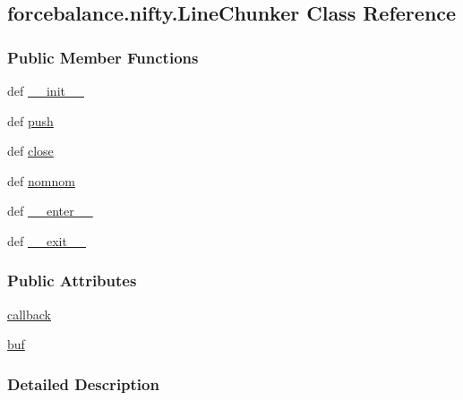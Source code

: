 \hypertarget{classforcebalance_1_1nifty_1_1LineChunker}{\subsection{forcebalance.\-nifty.\-Line\-Chunker \-Class \-Reference}
\label{classforcebalance_1_1nifty_1_1LineChunker}
}
\subsubsection*{\-Public \-Member \-Functions}
\begin{DoxyCompactItemize}
\item 
def \hyperlink{classforcebalance_1_1nifty_1_1LineChunker_ae3ab9c66002ff8c9cb1c431037a5b1bd}{\-\_\-\-\_\-init\-\_\-\-\_\-}
\item 
def \hyperlink{classforcebalance_1_1nifty_1_1LineChunker_a55559f3b01f982fabd8521d3255a659c}{push}
\item 
def \hyperlink{classforcebalance_1_1nifty_1_1LineChunker_a3ff808a8e8d1f37c1509b2c8a40793a0}{close}
\item 
def \hyperlink{classforcebalance_1_1nifty_1_1LineChunker_a8136910aad30f357f0ededf79803e582}{nomnom}
\item 
def \hyperlink{classforcebalance_1_1nifty_1_1LineChunker_a968159ea8646ab0a1b5f5a9428855ce5}{\-\_\-\-\_\-enter\-\_\-\-\_\-}
\item 
def \hyperlink{classforcebalance_1_1nifty_1_1LineChunker_a02b0e239f9fba956c36c4eb5d2771132}{\-\_\-\-\_\-exit\-\_\-\-\_\-}
\end{DoxyCompactItemize}
\subsubsection*{\-Public \-Attributes}
\begin{DoxyCompactItemize}
\item 
\hyperlink{classforcebalance_1_1nifty_1_1LineChunker_a96901fd1a8b40b5694070de7b45f1a1c}{callback}
\item 
\hyperlink{classforcebalance_1_1nifty_1_1LineChunker_ac5104269bab688eae457d141e44f91b1}{buf}
\end{DoxyCompactItemize}


\subsubsection{\-Detailed \-Description}


